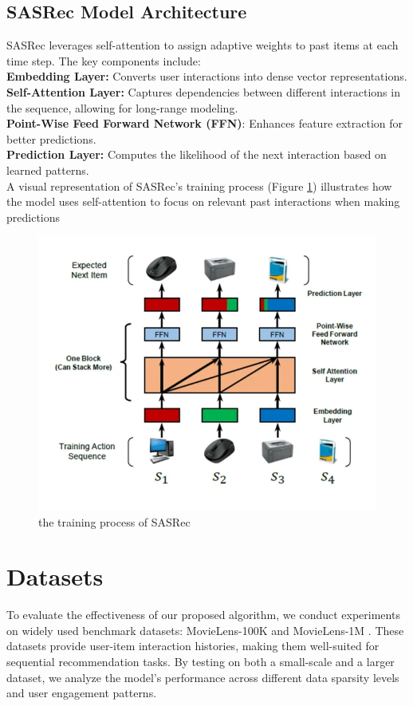 \subsection{SASRec Model Architecture}
SASRec leverages self-attention to assign adaptive weights to past items at each time step. The key components include:\\
\textbf{ Embedding Layer:} Converts user interactions into dense vector representations. \\
\textbf{ Self-Attention Layer: }Captures dependencies between different interactions in the sequence, allowing for long-range modeling.\\
\textbf{ Point-Wise Feed Forward Network (FFN)}: Enhances feature extraction for better predictions.\\
\textbf{Prediction Layer:} Computes the likelihood of the next interaction based on learned patterns.\\
A visual representation of SASRec’s training process (Figure \ref{the_training_process_of_SASRec}) illustrates how the model uses self-attention to focus on relevant past interactions when making predictions
\begin{figure}[ht]
	\centering
	\includegraphics[width=0.6\linewidth]{Figures/sasrec.png}
	\caption{the training process of SASRec\cite{kang2018selfat}}
	\label{the_training_process_of_SASRec}	
\end{figure}
\section{ Datasets}
To evaluate the effectiveness of our proposed algorithm, we conduct experiments on widely used benchmark datasets: MovieLens-100K and MovieLens-1M \cite{Harper2015}. These datasets provide user-item interaction histories, making them well-suited for sequential recommendation tasks. By testing on both a small-scale and a larger dataset, we analyze the model’s performance across different data sparsity levels and user engagement patterns.
